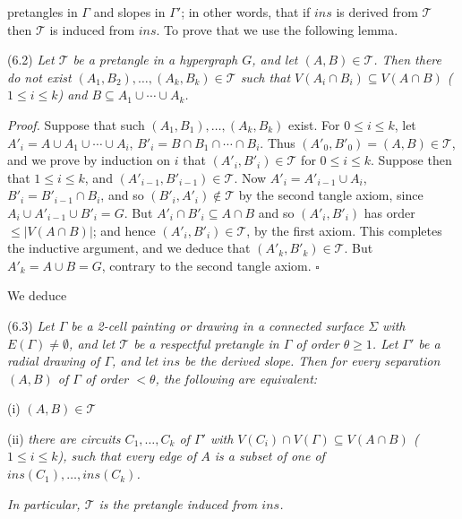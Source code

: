 \noindent pretangles in $\Gamma$ and slopes in $\Gamma'$; in other words, that if $ins$ is derived from $\mathscr{T}$ then $\mathscr{T}$ is induced from $ins$. To prove that we use the following lemma.

\stmt
(6.2) \textit{Let $\mathscr{T}$ be a pretangle in a hypergraph $G$, and let $(A, B) \in \mathscr{T}$. Then there do not exist $(A_1, B_2), \dots, (A_k, B_k) \in \mathscr{T}$ such that $V(A_i \cap B_i) \subseteq V(A \cap B)$ ($1 \le i \le k$) and $B \subseteq A_1 \cup \cdots \cup A_k$.}

\textit{Proof.} Suppose that such $(A_1, B_1), \dots, (A_k, B_k)$ exist. For $0 \le i \le k$, let $A'_i = A \cup A_1 \cup \cdots \cup A_i$, $B'_i = B \cap B_1 \cap \cdots \cap B_i$. Thus $(A'_0, B'_0) = (A, B) \in \mathscr{T}$, and we prove by induction on $i$ that $(A'_i, B'_i) \in \mathscr{T}$ for $0 \le i \le k$. Suppose then that $1 \le i \le k$, and $(A'_{i-1}, B'_{i-1}) \in \mathscr{T}$. Now $A'_i = A'_{i-1} \cup A_i$, $B'_i = B'_{i-1} \cap B_i$, and so $(B'_i, A'_i) \notin \mathscr{T}$ by the second tangle axiom, since $A_i \cup A'_{i-1} \cup B'_i = G$. But $A'_i \cap B'_i \subseteq A \cap B$ and so $(A'_i, B'_i)$ has order $\le |V(A \cap B)|$; and hence $(A'_i, B'_i) \in \mathscr{T}$, by the first axiom. This completes the inductive argument, and we deduce that $(A'_k, B'_k) \in \mathscr{T}$. But $A'_k = A \cup B = G$, contrary to the second tangle axiom. $\square$

We deduce

\stmt
(6.3) \textit{Let $\Gamma$ be a 2-cell painting or drawing in a connected surface $\Sigma$ with $E(\Gamma) \ne \emptyset$, and let $\mathscr{T}$ be a respectful pretangle in $\Gamma$ of order $\theta \ge 1$. Let $\Gamma'$ be a radial drawing of $\Gamma$, and let $ins$ be the derived slope. Then for every separation $(A, B)$ of $\Gamma$ of order $< \theta$, the following are equivalent:}

\hspace*{12pt}(i) $(A, B) \in \mathscr{T}$

\hspace*{12pt}(ii) \textit{there are circuits $C_1, \dots, C_k$ of $\Gamma'$ with $V(C_i) \cap V(\Gamma) \subseteq V(A \cap B)$ ($1 \le i \le k$), such that every edge of $A$ is a subset of one of $ins(C_1), \dots, ins(C_k)$.}

\textit{In particular, $\mathscr{T}$ is the pretangle induced from $ins$.}

